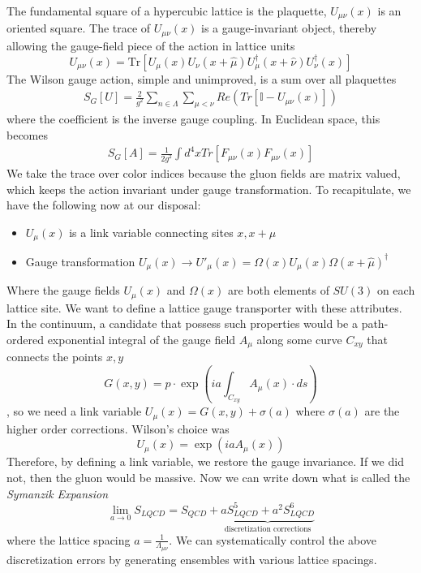     
The fundamental square of a hypercubic lattice is the plaquette, $U_{\mu\nu}(x)$ is an oriented square. The trace of  $U_{\mu\nu}(x)$ is a gauge-invariant object, thereby allowing the gauge-field piece of the action in lattice units  
\begin{equation}
    U_{\mu\nu}(x) = \text{Tr} \left[ U_\mu(x) U_\nu(x + \hat{\mu}) U_\mu^\dagger(x + \hat{\nu}) U_\nu^\dagger(x) \right]
\end{equation}
The Wilson gauge action, simple and unimproved, is a sum over all plaquettes
\begin{align}
    S_G[U] = \frac{2}{g^2} \sum_{n\in\Lambda}^{}\sum_{\mu < \nu}^{} Re\left(Tr\left[\mathbb{I} - U_{\mu\nu}(x)\right]\right)
\end{align}
where the coefficient is the inverse gauge coupling. 
In Euclidean space, this becomes 
\begin{align}
    S_G[A] = \frac{1}{2g^2} \int d^4x Tr\left[F_{\mu\nu}(x) F_{\mu\nu}(x)\right]
\end{align}
We take the trace over color indices because the gluon fields are matrix valued, which keeps the action invariant under gauge transformation. To recapitulate, we have the following now at our disposal:
\begin{itemize}
    \item $U_\mu(x)$ is a link variable connecting sites $x, x+\mu$ 
    \item Gauge transformation $U_\mu(x) \to U'_\mu(x) = \Omega(x)U_\mu(x)\Omega(x+\hat{\mu})^\dagger$
\end{itemize}
Where the gauge fields $U_\mu(x)$ and $\Omega(x)$ are both elements of $SU(3)$ on each lattice site. 
We want to define a lattice gauge transporter with these attributes. In the continuum, a candidate that possess such properties would be a path-ordered exponential integral of the gauge field $A_\mu$ along some curve $C_{xy}$ that connects the points $x,y$ 
\begin{equation}
    G(x,y) = p\cdot \exp\left(ia\int_{C_{xy}}^{}A_\mu(x) \cdot ds\right)
\end{equation},
so we need a link variable $U_\mu(x) = G(x,y) + \sigma(a)$ where $\sigma(a)$ are the higher order corrections. Wilson's choice was 
\begin{equation}
    U_\mu(x) = \exp\left(iaA_\mu(x)\right)
\end{equation}
Therefore, by defining a link variable, we restore the gauge invariance. If we did not, then the gluon would be massive. Now we can write down what is called the \textit{Symanzik Expansion} 
\begin{equation}
    \lim\limits_{a \to 0} S_{LQCD} = S_{QCD} + \underbrace{aS_{LQCD}^5 + a^2 S^6_{LQCD}}_{\text{discretization corrections}}
\end{equation} where the lattice spacing $a = \frac{1}{\Lambda_{\mu\nu}}$. We can systematically control the above discretization errors by generating ensembles with various lattice spacings. 

